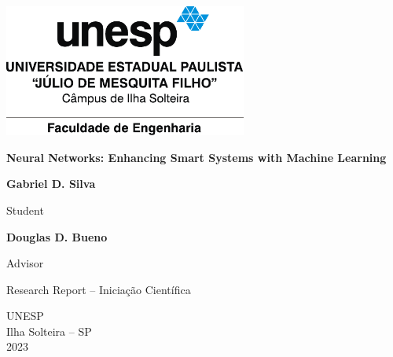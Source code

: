 \begin{titlepage}
    
\sffamily
\centering
\includegraphics[width=0.6\textwidth]{figures/logos/unesp-acessorio.pdf}



\vfill

{\LARGE\bfseries Neural Networks: Enhancing Smart Systems with Machine Learning}

\vfill

\textbf{Gabriel D. Silva}

Student

\textbf{Douglas D. Bueno}

Advisor

\hspace{2cm}

Research Report -- Iniciação Científica 

\hspace{4cm}

UNESP \\
Ilha Solteira -- SP \\
2023
\end{titlepage}


     
     
     
     
     
     
     
      

